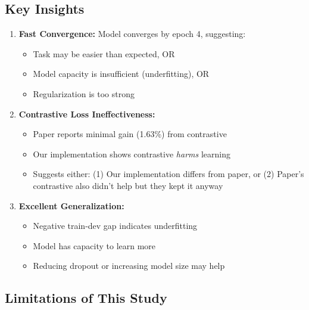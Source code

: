 \documentclass[12pt,a4paper]{article}
\begin{document}
\subsection{Key Insights}

\begin{enumerate}
    \item \textbf{Fast Convergence:} Model converges by epoch 4, suggesting:
    \begin{itemize}
        \item Task may be easier than expected, OR
        \item Model capacity is insufficient (underfitting), OR
        \item Regularization is too strong
    \end{itemize}
    
    \item \textbf{Contrastive Loss Ineffectiveness:}
    \begin{itemize}
        \item Paper reports minimal gain (1.63\%) from contrastive
        \item Our implementation shows contrastive \textit{harms} learning
        \item Suggests either: (1) Our implementation differs from paper, or (2) Paper's contrastive also didn't help but they kept it anyway
    \end{itemize}
    
    \item \textbf{Excellent Generalization:}
    \begin{itemize}
        \item Negative train-dev gap indicates underfitting
        \item Model has capacity to learn more
        \item Reducing dropout or increasing model size may help
    \end{itemize}
\end{enumerate}

\subsection{Limitations of This Study}
\end{document}
